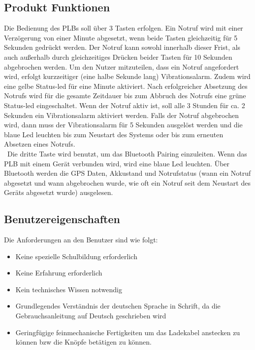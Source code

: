 \subsection{Produkt Funktionen}
Die Bedienung des PLBs soll über 3 Tasten erfolgen. Ein Notruf wird mit einer Verzögerung von einer Minute abgesetzt, wenn beide Tasten gleichzeitig für 5 Sekunden gedrückt werden. Der Notruf kann sowohl innerhalb dieser Frist, als auch außerhalb durch gleichzeitiges Drücken beider Tasten für 10 Sekunden abgebrochen werden. 
Um den Nutzer mitzuteilen, dass ein Notruf angefordert wird, erfolgt kurzzeitiger (eine  halbe Sekunde lang) Vibrationsalarm. Zudem wird eine gelbe Status-led für eine Minute aktiviert. Nach erfolgreicher Absetzung des Notrufs wird für die gesamte Zeitdauer bis zum Abbruch des Notrufs eine grüne Status-led eingeschaltet. Wenn der Notruf aktiv ist, soll alle 3 Stunden für ca. 2 Sekunden ein Vibrationsalarm aktiviert werden. Falls der Notruf abgebrochen wird, dann muss der Vibrationsalarm für 5 Sekunden ausgelöst werden und die blaue Led leuchten bis zum Neustart des Systems oder bis zum erneuten Absetzen eines Notrufs.\\\
Die dritte Taste wird benutzt, um das Bluetooth Pairing einzuleiten. Wenn das PLB mit einem Gerät verbunden wird, wird eine blaue Led leuchten. Über Bluetooth werden die GPS Daten, Akkustand und Notrufstatus (wann ein Notruf abgesetzt und wann abgebrochen wurde, wie oft ein Notruf seit dem Neustart des Geräts abgesetzt wurde) ausgelesen.
\subsection{Benutzereigenschaften}
Die Anforderungen an den Benutzer sind wie folgt:
\begin{itemize}
	\item Keine spezielle Schulbildung erforderlich
	\item Keine Erfahrung erforderlich
	\item Kein technisches Wissen notwendig
	\item Grundlegendes Verständnis der deutschen Sprache in Schrift, da die Gebrauchsanleitung auf Deutsch geschrieben wird
	\item Geringfügige feinmechanische Fertigkeiten um das Ladekabel anstecken zu können bzw die Knöpfe betätigen zu können.
\end{itemize}

